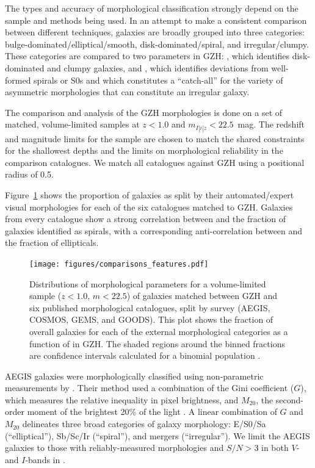 \documentclass[a4paper,fleqn,usenatbib]{mnras}
\begin{document}
The types and accuracy of morphological classification strongly depend on the
sample and methods being used. In an attempt to make a consistent comparison
between different techniques, galaxies are broadly grouped into three
categories: bulge-dominated/elliptical/smooth, disk-dominated/spiral, and
irregular/clumpy. These categories are compared to two parameters in GZH:
\fbest, which identifies disk-dominated and clumpy galaxies, and \fodd, which
identifies deviations from well-formed spirals or S0s and which constitutes a
``catch-all'' for the variety of asymmetric morphologies that can constitute an
irregular galaxy. 

The comparison and analysis of the GZH morphologies is done on a set of matched,
volume-limited samples at $z<1.0$ and $m_{I|i|z} < 22.5$~mag.  The redshift and
magnitude limits for the sample are chosen to match the shared constraints for
the shallowest depths \citep[GEMS;][]{bun05} and the limits on morphological
reliability \citep[COSMOS/ZEST;][]{sca07} in the comparison catalogues. We match
all catalogues against GZH using a positional radius of 0.5\arcsec.

Figure~\ref{fig:comparisons_features} shows the proportion of galaxies as split
by their automated/expert visual morphologies for each of the six catalogues
matched to GZH. Galaxies from every catalogue show a strong correlation between
\fbest{} and the fraction of galaxies identified as spirals, with a
corresponding anti-correlation between \fbest{} and the fraction of
ellipticals.

\begin{figure}
\center
\texttt{[image: figures/comparisons\_features.pdf]}
\caption{Distributions of morphological parameters for a volume-limited sample
($z<1.0$, $m<22.5$) of galaxies matched between GZH and six published
morphological catalogues, split by survey (AEGIS, COSMOS, GEMS, and GOODS). This
plot shows the fraction of overall galaxies for each of the external
morphological categories as a function of \fbest{} in GZH. The shaded regions
around the binned fractions are confidence intervals calculated for a binomial
population \citep{cam11}.}
\label{fig:comparisons_features}
\end{figure}

AEGIS galaxies were morphologically classified using non-parametric
measurements by \citet{lot08}. Their method used a combination of the Gini
coefficient ($G$), which measures the relative inequality in pixel brightness,
and $M_{20}$, the second-order moment of the brightest 20\% of the light
\citep{lot04}. A linear combination of $G$ and $M_{20}$ delineates three broad
categories of galaxy morphology: E/S0/Sa (``elliptical''), Sb/Sc/Ir
(``spiral''), and mergers (``irregular''). We limit the AEGIS galaxies to those
with reliably-measured morphologies and $S/N>3$ in both $V$- and $I$-bands in
\citet{lot08}. 
\end{document}
